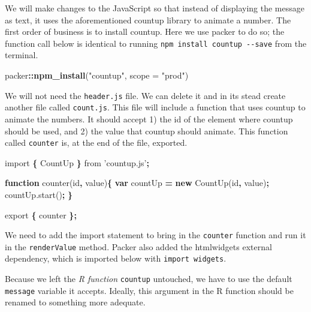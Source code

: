 \documentclass[10pt,]{krantz}
\makeatletter
\newenvironment{Shaded}{\begin{snugshade}}{\end{snugshade}}
\newcommand{\AttributeTok}[1]{\textcolor[rgb]{0.61,0.61,0.61}{#1}}
\newcommand{\DataTypeTok}[1]{\textcolor[rgb]{0.27,0.27,0.27}{#1}}
\newcommand{\ImportTok}[1]{#1}
\newcommand{\KeywordTok}[1]{\textcolor[rgb]{0.27,0.27,0.27}{\textbf{#1}}}
\newcommand{\NormalTok}[1]{#1}
\newcommand{\OperatorTok}[1]{\textcolor[rgb]{0.43,0.43,0.43}{\textbf{#1}}}
\newcommand{\StringTok}[1]{\textcolor[rgb]{0.5,0.5,0.5}{#1}}
\newcommand{\VariableTok}[1]{\textcolor[rgb]{0,0,0}{#1}}
\newenvironment{kframe}{%
\medskip{}
\setlength{\fboxsep}{.8em}
 \def\at@end@of@kframe{}%
 \ifinner\ifhmode%
  \def\at@end@of@kframe{\end{minipage}}%
  \begin{minipage}{\columnwidth}%
 \fi\fi%
 \def\FrameCommand##1{\hskip\@totalleftmargin \hskip-\fboxsep
 \colorbox{shadecolor}{##1}\hskip-\fboxsep
     \hskip-\linewidth \hskip-\@totalleftmargin \hskip\columnwidth}%
 \MakeFramed {\advance\hsize-\width
   \@totalleftmargin\z@ \linewidth\hsize
   \@setminipage}}%
 {\par\unskip\endMakeFramed%
 \at@end@of@kframe}
\renewenvironment{Shaded}{\begin{kframe}}{\end{kframe}}
\makeatother
\begin{document}
We will make changes to the JavaScript so that instead of displaying the message as text, it uses the aforementioned countup library to animate a number. The first order of business is to install countup. Here we use packer to do so; the function call below is identical to running \texttt{npm\ install\ countup\ -\/-save} from the terminal.

\begin{Shaded}
\begin{Highlighting}[]
\NormalTok{packer}\OperatorTok{::}\KeywordTok{npm_install}\NormalTok{(}\StringTok{"countup"}\NormalTok{, }\DataTypeTok{scope =} \StringTok{"prod"}\NormalTok{) }
\end{Highlighting}
\end{Shaded}

We will not need the \texttt{header.js} file. We can delete it and in its stead create another file called \texttt{count.js}. This file will include a function that uses countup to animate the numbers. It should accept 1) the id of the element where countup should be used, and 2) the value that countup should animate. This function called \texttt{counter} is, at the end of the file, exported.

\begin{Shaded}
\begin{Highlighting}[]
\ImportTok{import} \OperatorTok{\{}\NormalTok{ CountUp }\OperatorTok{\}} \ImportTok{from} \StringTok{'countup.js'}\OperatorTok{;}

\KeywordTok{function} \AttributeTok{counter}\NormalTok{(id}\OperatorTok{,}\NormalTok{ value)}\OperatorTok{\{}
  \KeywordTok{var}\NormalTok{ countUp }\OperatorTok{=} \KeywordTok{new} \AttributeTok{CountUp}\NormalTok{(id}\OperatorTok{,}\NormalTok{ value)}\OperatorTok{;}
  \VariableTok{countUp}\NormalTok{.}\AttributeTok{start}\NormalTok{()}\OperatorTok{;}
\OperatorTok{\}}

\ImportTok{export} \OperatorTok{\{}\NormalTok{ counter }\OperatorTok{\};}
\end{Highlighting}
\end{Shaded}

We need to add the import statement to bring in the \texttt{counter} function and run it in the \texttt{renderValue} method. Packer also added the htmlwidgets external dependency, which is imported below with \texttt{import\ \textquotesingle{}widgets\textquotesingle{}}.

Because we left the \emph{R function} \texttt{countup} untouched, we have to use the default \texttt{message} variable it accepts. Ideally, this argument in the R function should be renamed to something more adequate.
\end{document}
